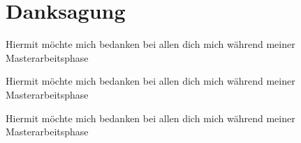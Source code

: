  \chapter*{Danksagung}

\begin{otherlanguage}{ngerman}
  \thispagestyle{empty}

  Hiermit möchte mich bedanken bei allen dich mich während meiner Masterarbeitsphase

  Hiermit möchte mich bedanken bei allen dich mich während meiner Masterarbeitsphase

  Hiermit möchte mich bedanken bei allen dich mich während meiner Masterarbeitsphase

  \null\vfill
  \noindent
\end{otherlanguage}
